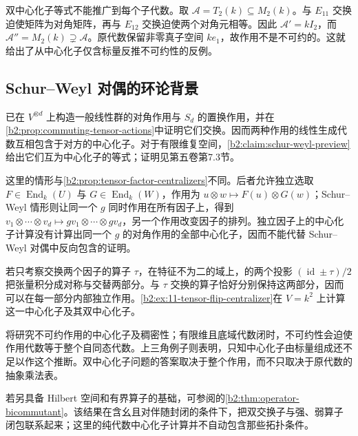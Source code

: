 \ProseParagraphBreak
双中心化子等式不能推广到每个子代数。取 \(\mathcal A=T_2(k)\subseteq M_2(k)\)。与 \(E_{11}\) 交换迫使矩阵为对角矩阵，再与 \(E_{12}\) 交换迫使两个对角元相等。因此 \(\mathcal A'=kI_2\)，而 \(\mathcal A''=M_2(k)\supsetneq\mathcal A\)。原代数保留非零真子空间 \(ke_1\)，故作用不是不可约的。这就给出了从中心化子仅含标量反推不可约性的反例。

\subsection{Schur–Weyl 对偶的环论背景}
\label{b2:subsec:1104:03}

已在 \(V^{\otimes d}\) 上构造一般线性群的对角作用与 \(S_d\) 的置换作用，并在\cref{b2:prop:commuting-tensor-actions}中证明它们交换。因而两种作用的线性生成代数互相包含于对方的中心化子。对于有限维复空间，\cref{b2:claim:schur-weyl-preview}给出它们互为中心化子的等式；证明见第五卷第7.3节。

\ProseParagraphBreak
这里的情形与\cref{b2:prop:tensor-factor-centralizers}不同。后者允许独立选取 \(F\in\operatorname{End}_k(U)\) 与 \(G\in\operatorname{End}_k(W)\)，作用为 \(u\otimes w\mapsto F(u)\otimes G(w)\)；Schur--Weyl 情形则让同一个 \(g\) 同时作用在所有因子上，得到 \(v_1\otimes\cdots\otimes v_d\mapsto gv_1\otimes\cdots\otimes gv_d\)，另一个作用改变因子的排列。独立因子上的中心化子计算没有计算出同一个 \(g\) 的对角作用的全部中心化子，因而不能代替 Schur--Weyl 对偶中反向包含的证明。

\ProseParagraphBreak
若只考察交换两个因子的算子 \(\tau\)，在特征不为二的域上，的两个投影 \((\operatorname{id}\pm\tau)/2\) 把张量积分成对称与交替两部分。与 \(\tau\) 交换的算子恰好分别保持这两部分，因而可以在每一部分内部独立作用。\cref{b2:ex:11-tensor-flip-centralizer}在 \(V=k^2\) 上计算这一中心化子及其双中心化子。

\ProseParagraphBreak
{}将研究不可约作用的中心化子及稠密性；有限维且底域代数闭时，不可约性会迫使作用代数等于整个自同态代数。上三角例子则表明，只知中心化子由标量组成还不足以作这个推断。双中心化子问题的答案取决于整个作用，而不只取决于原代数的抽象乘法表。

\ProseParagraphBreak
若另具备 Hilbert 空间和有界算子的基础，可参阅的\cref{b2:thm:operator-bicommutant}。该结果在含幺且对伴随封闭的条件下，把双交换子与强、弱算子闭包联系起来；这里的纯代数中心化子计算并不自动包含那些拓扑条件。
